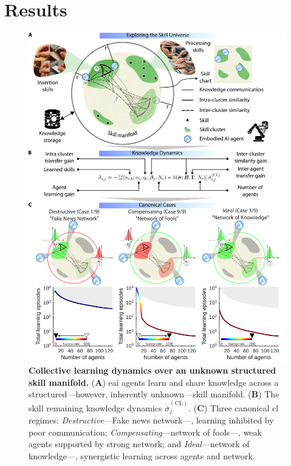 \documentclass[12pt]{article}
\begin{document}
\section*{Results}\label{sec:main_results}
\begin{figure}[t!]
	\centering
	\hspace*{\fill}
	\includegraphics[width=13cm]{collective_learning_and_skill_manifold_conceptualization.png}
	\hspace*{\fill}
    \caption{\label{fig:collective_learning_and_skill_manifold_conceptualization} 
    	\textbf{Collective learning dynamics over an unknown structured skill manifold.} 
    	(\textbf{A}) \ac{eai} agents learn and share knowledge across a structured---however, inherently unknown---skill manifold. (\textbf{B}) The skill remaining knowledge dynamics $\dot{\bar{\sigma}}^{(\mathrm{CL})}_j$. (\textbf{C}) Three canonical \ac{cl} regimes: \textit{Destructive}---Fake news network---, learning inhibited by poor communication; \textit{Compensating}---network of fools---, weak agents supported by strong network; and \textit{Ideal}---network of knowledge---, synergistic learning across agents and network.        
    }
\end{figure}
\end{document}

